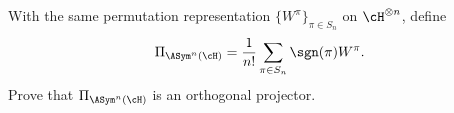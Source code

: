 With the same permutation representation $\{W^\pi\}_{\pi\in S_n}$ on $\cH^{\otimes n}$, define
$$
\Pi_{\ASym^n(\cH)}
=
\frac{1}{n!}\sum_{\pi\in S_n}\sgn(\pi)W^\pi.
$$
Prove that $\Pi_{\ASym^n(\cH)}$ is an orthogonal projector.

